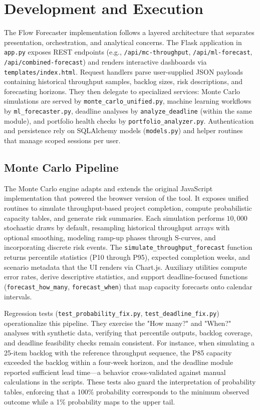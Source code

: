 \section{Development and Execution}
The Flow Forecaster implementation follows a layered architecture that separates presentation, orchestration, and analytical concerns. The Flask application in \texttt{app.py} exposes REST endpoints (e.g., \texttt{/api/mc-throughput}, \texttt{/api/ml-forecast}, \texttt{/api/combined-forecast}) and renders interactive dashboards via \texttt{templates/index.html}. Request handlers parse user-supplied JSON payloads containing historical throughput samples, backlog sizes, risk descriptions, and forecasting horizons. They then delegate to specialized services: Monte Carlo simulations are served by \texttt{monte\_carlo\_unified.py}, machine learning workflows by \texttt{ml\_forecaster.py}, deadline analyses by \texttt{analyze\_deadline} (within the same module), and portfolio health checks by \texttt{portfolio\_analyzer.py}. Authentication and persistence rely on SQLAlchemy models (\texttt{models.py}) and helper routines that manage scoped sessions per user.

\subsection{Monte Carlo Pipeline}
The Monte Carlo engine adapts and extends the original JavaScript implementation that powered the browser version of the tool. It exposes unified routines to simulate throughput-based project completion, compute probabilistic capacity tables, and generate risk summaries. Each simulation performs $10{,}000$ stochastic draws by default, resampling historical throughput arrays with optional smoothing, modeling ramp-up phases through S-curves, and incorporating discrete risk events. The \texttt{simulate\_throughput\_forecast} function returns percentile statistics (P10 through P95), expected completion weeks, and scenario metadata that the UI renders via Chart.js. Auxiliary utilities compute error rates, derive descriptive statistics, and support deadline-focused functions (\texttt{forecast\_how\_many}, \texttt{forecast\_when}) that map capacity forecasts onto calendar intervals.

Regression tests (\texttt{test\_probability\_fix.py}, \texttt{test\_deadline\_fix.py}) operationalize this pipeline. They exercise the "How many?" and "When?" analyses with synthetic data, verifying that percentile outputs, backlog coverage, and deadline feasibility checks remain consistent. For instance, when simulating a 25-item backlog with the reference throughput sequence, the P85 capacity exceeded the backlog within a four-week horizon, and the deadline module reported sufficient lead time---a behavior cross-validated against manual calculations in the scripts. These tests also guard the interpretation of probability tables, enforcing that a 100\% probability corresponds to the minimum observed outcome while a 1\% probability maps to the upper tail.

